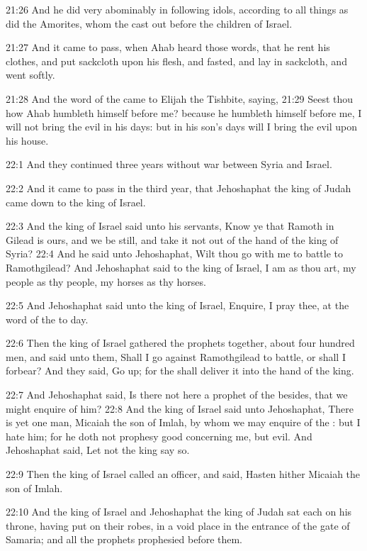 21:26 And he did very abominably in following idols, according to all things as did the Amorites, whom the \LORD cast out before the children of Israel.

21:27 And it came to pass, when Ahab heard those words, that he rent his clothes, and put sackcloth upon his flesh, and fasted, and lay in sackcloth, and went softly.

21:28 And the word of the \LORD came to Elijah the Tishbite, saying, 21:29 Seest thou how Ahab humbleth himself before me? because he humbleth himself before me, I will not bring the evil in his days: but in his son's days will I bring the evil upon his house.

22:1 And they continued three years without war between Syria and Israel.

22:2 And it came to pass in the third year, that Jehoshaphat the king of Judah came down to the king of Israel.

22:3 And the king of Israel said unto his servants, Know ye that Ramoth in Gilead is ours, and we be still, and take it not out of the hand of the king of Syria?  22:4 And he said unto Jehoshaphat, Wilt thou go with me to battle to Ramothgilead? And Jehoshaphat said to the king of Israel, I am as thou art, my people as thy people, my horses as thy horses.

22:5 And Jehoshaphat said unto the king of Israel, Enquire, I pray thee, at the word of the \LORD to day.

22:6 Then the king of Israel gathered the prophets together, about four hundred men, and said unto them, Shall I go against Ramothgilead to battle, or shall I forbear? And they said, Go up; for the \LORD shall deliver it into the hand of the king.

22:7 And Jehoshaphat said, Is there not here a prophet of the \LORD besides, that we might enquire of him?  22:8 And the king of Israel said unto Jehoshaphat, There is yet one man, Micaiah the son of Imlah, by whom we may enquire of the \LORD: but I hate him; for he doth not prophesy good concerning me, but evil. And Jehoshaphat said, Let not the king say so.

22:9 Then the king of Israel called an officer, and said, Hasten hither Micaiah the son of Imlah.

22:10 And the king of Israel and Jehoshaphat the king of Judah sat each on his throne, having put on their robes, in a void place in the entrance of the gate of Samaria; and all the prophets prophesied before them.


